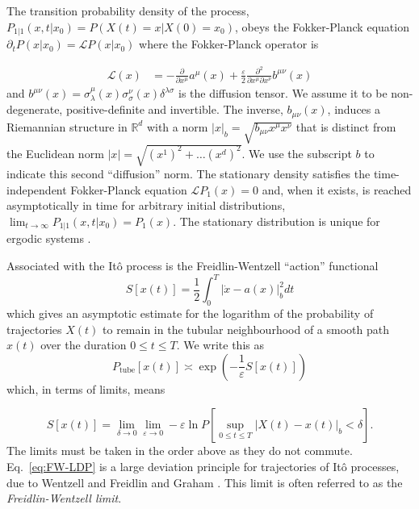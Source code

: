 The transition probability density
of the process, $P_{1|1}(x,t|x_{0})=P(X(t)=x|X(0)=x_{0})$, obeys
the Fokker-Planck equation $\partial_{t}P(x|x_{0})=\mathcal{L}P(x|x_{0})$
where the Fokker-Planck operator is

\emph{
\begin{equation}
\begin{aligned}\mathcal{L}(x) & =-\frac{\partial}{\partial x^{\mu}}a^{\mu}(x)+\frac{\varepsilon}{2}\frac{\partial^{2}}{\partial x^{\mu}\partial x^{\nu}}b^{\mu\nu}(x)\end{aligned}
\label{eq:fokker-planck}
\end{equation}
}and \textbf{$b^{\mu\nu}(x)=\sigma_{\lambda}^{\mu}(x)\sigma_{\sigma}^{\nu}(x)\delta^{\lambda\sigma}$}
is the diffusion tensor. We assume it to be non-degenerate, positive-definite
and invertible. The inverse, $b_{\mu\nu}(x)$, induces a Riemannian
structure in $\mathbb{R}^{d}$ with a norm $|x|_{b}=\sqrt{b_{\mu\nu}x^{\mu}x^{\nu}}$
that is distinct from the Euclidean norm $|x|=\sqrt{(x^{1})^{2}+\ldots(x^{d})^{2}}.$
We use the subscript $b$ to indicate this second ``diffusion''
norm. The stationary density satisfies the time-independent Fokker-Planck
equation $\mathcal{L}P_{1}(x)=0$ and, when it exists, is reached
asymptotically in time for arbitrary initial distributions, $\lim_{t\rightarrow\infty}P_{1|1}(x,t|x_{0})=P_{1}(x)$.
The stationary distribution is unique for ergodic
systems \citep{pavliotisStochasticProcessesApplications2014a}. 

Associated with the Itô process is the Freidlin-Wentzell ``action''
functional \citep{wentzellSmallRandomPerturbations1970, graham1973statistical, graham1987macroscopic}
\begin{equation}
S[x(t)]=\frac{1}{2}\int_{0}^{T}|\dot{x}-a(x)|_{b}^{2}dt\label{eq:Freidlin-Wentzell action}
\end{equation}
which gives an asymptotic estimate for the logarithm of the probability
of trajectories $X(t)$ to remain in the tubular neighbourhood of
a smooth path $x(t)$ over the duration $0\le t\leq T$. We write
this as
\begin{equation}
P_{\text{tube}}[x(t)]\asymp\exp\left(-\frac{1}{\varepsilon}S[x(t)]\right)\label{eq:FW-LDP}
\end{equation}
which, in terms of limits, means

\[
S[x(t)]=\lim_{\delta\to0}\lim_{\varepsilon\to0}-\varepsilon\ln P\left[\sup_{0\leq t\leq T}|X(t)-x(t)|_{b}<\delta\right].
\]
The limits must be taken in the order above as they do not commute.
Eq.~\ref{eq:FW-LDP} is a large deviation principle for trajectories
of Itô processes, due to Wentzell and Freidlin and Graham \citep{touchetteLargeDeviationApproach2009}. This limit is often referred to as the \textit{Freidlin-Wentzell limit}.

